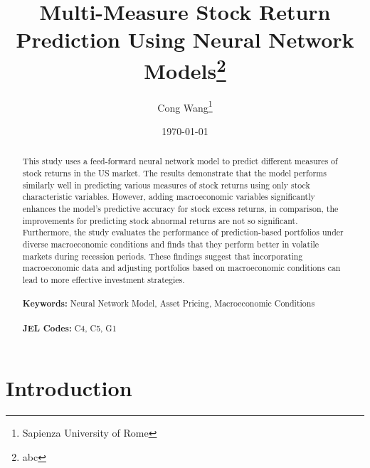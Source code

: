 \documentclass[12pt]{article}
\begin{document}
\begin{titlepage}
\title{Multi-Measure Stock Return Prediction Using Neural Network Models\thanks{abc}}
\author{Cong Wang\thanks{Sapienza University of Rome}}
\date{\today}
\maketitle
\begin{abstract}
\noindent This study uses a feed-forward neural network model to predict different measures of stock returns in the US market. The results demonstrate that the model performs similarly well in predicting various measures of stock returns using only stock characteristic variables. However, adding macroeconomic variables significantly enhances the model's predictive accuracy for stock excess returns, in comparison, the improvements for predicting stock abnormal returns are not so significant. Furthermore, the study evaluates the performance of prediction-based portfolios under diverse macroeconomic conditions and finds that they perform better in volatile markets during recession periods. These findings suggest that incorporating macroeconomic data and adjusting portfolios based on macroeconomic conditions can lead to more effective investment strategies.\\
\vspace{0in}\\
\noindent\textbf{Keywords:} Neural Network Model, Asset Pricing, Macroeconomic Conditions\\
\vspace{0in}\\
\noindent\textbf{JEL Codes:} C4, C5, G1\\

\bigskip
\end{abstract}
\setcounter{page}{0}
\thispagestyle{empty}
\end{titlepage}
\pagebreak \newpage

\doublespacing

\section{Introduction} \label{sec:introduction}

\end{document}
